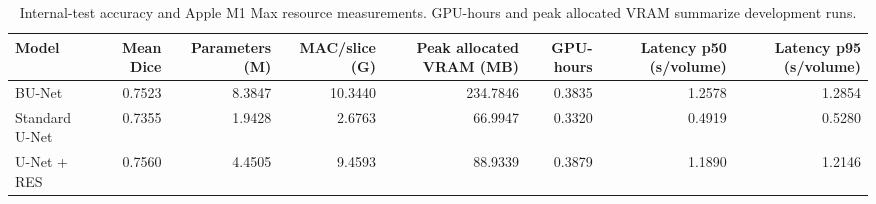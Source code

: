 \begin{table}[htbp]
\caption{Internal-test accuracy and Apple M1 Max resource measurements. GPU-hours and peak allocated VRAM summarize development runs.}
\label{tab:table02_architecture_resources}
\begin{tabular}{lrrrrrrr}
\toprule
Model & Mean Dice & Parameters (M) & MAC/slice (G) & Peak allocated VRAM (MB) & GPU-hours & Latency p50 (s/volume) & Latency p95 (s/volume) \\
\midrule
BU-Net & 0.7523 & 8.3847 & 10.3440 & 234.7846 & 0.3835 & 1.2578 & 1.2854 \\
Standard U-Net & 0.7355 & 1.9428 & 2.6763 & 66.9947 & 0.3320 & 0.4919 & 0.5280 \\
U-Net + RES & 0.7560 & 4.4505 & 9.4593 & 88.9339 & 0.3879 & 1.1890 & 1.2146 \\
\bottomrule
\end{tabular}
\end{table}
